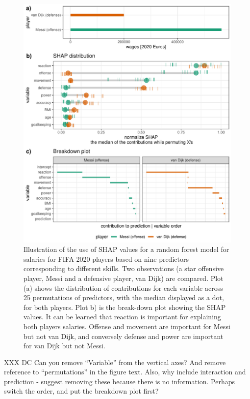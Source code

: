 \documentclass[
]{article}
\begin{document}
\begin{figure}

{\centering \includegraphics[width=29.17in]{./figures/shap_distr_bd} 

}

\caption{Illustration of the use of SHAP values for a random forest model for salaries for FIFA 2020 players based on nine predictors corresponding to different skills. Two observations (a star offensive player, Messi and a defensive player, van Dijk) are compared. Plot (a) shows the distribution of contributions for each variable across 25 permutations of predictors, with the median displayed as a dot, for both players. Plot b) is the break-down plot showing the SHAP values. It can be learned that reaction is important for explaining both players salaries. Offense and movement are important for Messi but not van Dijk, and conversely defense and power are important for van Dijk but not Messi.}\label{fig:shapdistrbd}
\end{figure}

XXX DC Can you remove ``Variable'' from the vertical axes? And remove
reference to ``permutations'' in the figure text. Also, why include
interaction and prediction - suggest removing these because there is no
information. Perhaps switch the order, and put the breakdown plot first?
\end{document}
